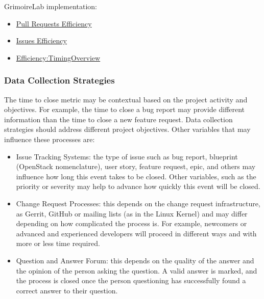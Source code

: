 \documentclass[
  12pt,
]{article}
\providecommand{\tightlist}{%
  \setlength{\itemsep}{0pt}\setlength{\parskip}{0pt}}
\begin{document}
GrimoireLab implementation:

\begin{itemize}
\tightlist
\item
  \href{https://chaoss.github.io/grimoirelab-sigils/panels/github-pullrequests-efficiency/}{Pull
  Requests Efficiency}\\
\item
  \href{https://chaoss.github.io/grimoirelab-sigils/panels/github-issues-efficiency/}{Issues
  Efficiency}\\
\item
  \href{https://chaoss.github.io/grimoirelab-sigils/panels/efficiency-timing-overview/}{Efficiency:TimingOverview}
\end{itemize}

\hypertarget{data-collection-strategies-3}{%
\subsubsection{Data Collection
Strategies}\label{data-collection-strategies-3}}

The time to close metric may be contextual based on the project activity
and objectives. For example, the time to close a bug report may provide
different information than the time to close a new feature request. Data
collection strategies should address different project objectives. Other
variables that may influence these processes are:

\begin{itemize}
\tightlist
\item
  Issue Tracking Systems: the type of issue such as bug report,
  blueprint (OpenStack nomenclature), user story, feature request, epic,
  and others may influence how long this event takes to be closed. Other
  variables, such as the priority or severity may help to advance how
  quickly this event will be closed.\\
\item
  Change Request Processes: this depends on the change request
  infrastructure, as Gerrit, GitHub or mailing lists (as in the Linux
  Kernel) and may differ depending on how complicated the process is.
  For example, newcomers or advanced and experienced developers will
  proceed in different ways and with more or less time required.\\
\item
  Question and Answer Forum: this depends on the quality of the answer
  and the opinion of the person asking the question. A valid answer is
  marked, and the process is closed once the person questioning has
  successfully found a correct answer to their question.
\end{itemize}
\end{document}
